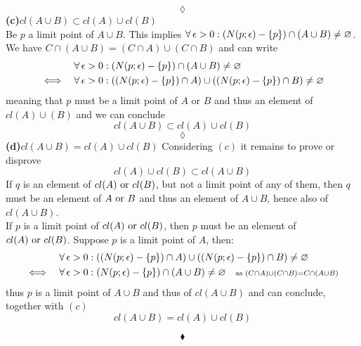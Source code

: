 $$\lozenge$$
\textbf{(c)$cl (A\cup B) \subset cl(A)\cup cl (B)$\\}
Be $p$ a limit point of $A\cup B$. This implies $\forall\,\epsilon >0: \left(N(p;\epsilon)-\{p\}\right)\cap(A\cup B)\neq \varnothing$. We have $C\cap\left(A\cup B\right)= \left(C\cap A\right)\cup \left(C\cap B\right)$ and can write
\begin{align*}
&\forall\,\epsilon >0: \left(N(p;\epsilon)-\{p\}\right)\cap(A\cup B)\neq \varnothing\\
\iff\quad & \forall\,\epsilon >0: \left(\left(N(p;\epsilon)-\{p\}\right)\cap A\right)\cup \left(\left(N(p;\epsilon)-\{p\}\right)\cap B \right)\neq\varnothing
\end{align*}
meaning that $p$ must be a limit point of $A$ or $B$ and thus an element of $cl(A)\cup(B)$ and we can conclude 
$$cl (A\cup B) \subset cl(A)\cup cl (B)$$
$$\lozenge$$
\textbf{(d)$cl (A\cup B) = cl(A)\cup cl (B)$}
Considering $(c)$ it remains to prove or disprove
$$cl(A)\cup cl (B)\subset cl (A\cup B)$$
If $q$ is an element of $cl(A)\text{ or } cl (B)$, but not a limit point of any of them, then $q$ must be an element of $A\text{ or } B$ and thus an element of $A\cup B$, hence also of $cl(A\cup B)$.\\
If $p$ is a limit point of $cl(A)\text{ or } cl (B)$, then $p$ must be an element of $cl(A)\text{ or } cl(B)$. Suppose $p$ is a limit point of $A$, then:  
\begin{align*}
& \forall\,\epsilon >0: \left(\left(N(p;\epsilon)-\{p\}\right)\cap A\right)\cup \left(\left(N(p;\epsilon)-\{p\}\right)\cap B \right)\neq\varnothing\\
\iff\quad &\forall\,\epsilon >0: \left(N(p;\epsilon)-\{p\}\right)\cap(A\cup B)\neq \varnothing\quad \scriptstyle \text{as }\left(C\cap A\right)\cup \left(C\cap B\right)=C\cap\left(A\cup B\right)\textstyle
\end{align*} 
thus $p$ is a limit point of $A\cup B$ and thus of $cl(A\cup B)$ and can conclude, together with $(c)$
$$cl (A\cup B) = cl(A)\cup cl (B)$$

$$\blacklozenge$$
\newpage


\renewcommand{\thesubsection}{\thesection.\arabic{subsection}}
\setcounter{subsection}{0}